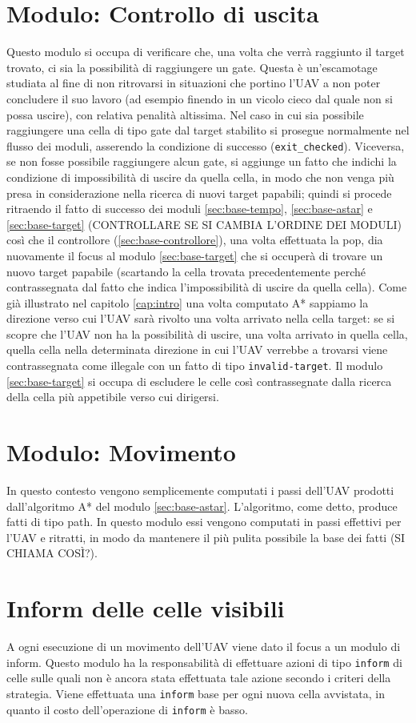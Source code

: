 \section{Modulo: Controllo di uscita} \label{sec:base-uscita}
Questo modulo si occupa di verificare che, una volta che verrà raggiunto il target trovato, ci sia la possibilità di raggiungere un gate. Questa è un'escamotage studiata al fine di non ritrovarsi in situazioni che portino l'UAV a non poter concludere il suo lavoro (ad esempio finendo in un vicolo cieco dal quale non si possa uscire), con relativa penalità altissima.
Nel caso in cui sia possibile raggiungere una cella di tipo gate dal target stabilito si prosegue normalmente nel flusso dei moduli, asserendo la condizione di successo (\texttt{exit\_checked}). Viceversa, se non fosse possibile raggiungere alcun gate, si aggiunge un fatto che indichi la condizione di impossibilità di uscire da quella cella, in modo che non venga più presa in considerazione nella ricerca di nuovi target papabili; quindi si procede ritraendo il fatto di successo dei moduli \ref{sec:base-tempo}, \ref{sec:base-astar} e \ref{sec:base-target} {\color{red}(CONTROLLARE SE SI CAMBIA L'ORDINE DEI MODULI) }così che il controllore (\ref{sec:base-controllore}), una volta effettuata la pop, dia nuovamente il focus al modulo \ref{sec:base-target} che si occuperà di trovare un nuovo target papabile (scartando la cella trovata precedentemente perché contrassegnata dal fatto che indica l'impossibilità di uscire da quella cella). Come già illustrato nel capitolo \ref{cap:intro} una volta computato A* sappiamo la direzione verso cui l'UAV sarà rivolto una volta arrivato nella cella target: se si scopre che l'UAV non ha la possibilità di uscire, una volta arrivato in quella cella, quella cella nella determinata direzione in cui l'UAV verrebbe a trovarsi viene contrassegnata come illegale con un fatto di tipo \texttt{invalid-target}. Il modulo \ref{sec:base-target} si occupa di escludere le celle così contrassegnate dalla ricerca della cella più appetibile verso cui dirigersi.

\section{Modulo: Movimento} \label{sec:base-movimento}
In questo contesto vengono semplicemente computati i passi dell'UAV prodotti dall'algoritmo A* del modulo \ref{sec:base-astar}. L'algoritmo, come detto, produce fatti di tipo path. In questo modulo essi vengono computati in passi effettivi per l'UAV e ritratti, in modo da mantenere il più pulita possibile la {\color{red}base dei fatti (SI CHIAMA COSÌ?)}.

\section{Inform delle celle visibili} \label{sec:inform}
A ogni esecuzione di un movimento dell'UAV viene dato il focus a un modulo di inform. Questo modulo ha la responsabilità di effettuare azioni di tipo \texttt{inform} di celle sulle quali non è ancora stata effettuata tale azione secondo i criteri della strategia. Viene effettuata una \texttt{inform} base per ogni nuova cella avvistata, in quanto il costo dell'operazione di \texttt{inform} è basso.
